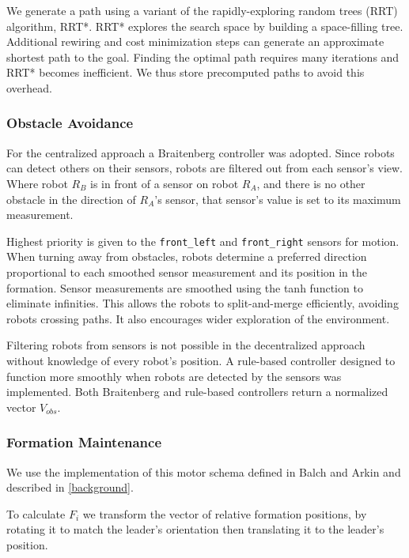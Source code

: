 \documentclass[letterpaper, 10 pt, conference]{ieeeconf}  %
\begin{document}
We generate a path using a variant of the rapidly-exploring random trees (RRT) algorithm, RRT*. RRT* explores the search space by building a space-filling tree. Additional rewiring and cost minimization steps can generate an approximate shortest path to the goal. Finding the optimal path requires many iterations and RRT* becomes inefficient. We thus store precomputed paths to avoid this overhead.

\subsubsection*{Obstacle Avoidance}

For the centralized approach a Braitenberg controller was adopted. Since robots can detect others on their sensors, robots are filtered out from each sensor's view. Where robot $R_B$ is in front of a sensor on robot $R_A$, and there is no other obstacle in the direction of $R_A$'s sensor, that sensor's value is set to its maximum measurement.

Highest priority is given to the \texttt{front\_left} and \texttt{front\_right} sensors for motion. When turning away from obstacles, robots determine a preferred direction proportional to each smoothed sensor measurement and its position in the formation. Sensor measurements are smoothed using the tanh function to eliminate infinities. This allows the robots to split-and-merge efficiently, avoiding robots crossing paths. It also encourages wider exploration of the environment.

Filtering robots from sensors is not possible in the decentralized approach without knowledge of every robot's position. A rule-based controller designed to function more smoothly when robots are detected by the sensors was implemented. Both Braitenberg and rule-based controllers return a normalized vector $V_{obs}$.

\subsubsection*{Formation Maintenance}

We use the implementation of this motor schema defined in Balch and Arkin and described in \ref{background}. 

To calculate $F_i$ we transform the vector of relative formation positions, by rotating it to match the leader's orientation then translating it to the leader's position.
\end{document}
